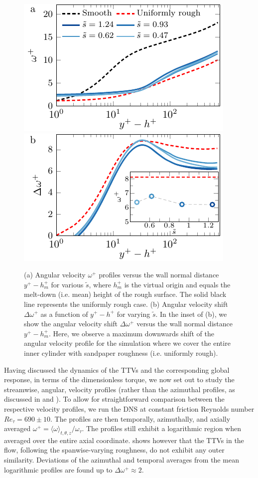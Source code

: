 \begin{figure}
\centering
  \includegraphics[width=0.49\linewidth]{fig9a_omegaplus.pdf}
  \includegraphics[width=0.49\linewidth]{fig9b_d0.pdf}
\caption{
(a) Angular velocity $\omega^+$ profiles versus the wall normal distance $y^+-h_m^+$ for various $\tilde{s}$, where $h_m^+$ is the virtual origin and equals the melt-down (i.e. mean) height of the rough surface. The solid black line represents the uniformly rough case. (b) Angular velocity shift $\Delta \omega^+$ as a function of $y^+-h^+$ for varying $\tilde s$. In the inset of (b), we show the angular velocity shift $\Delta \omega^+$ versus the wall normal distance $y^+-h_m^+$. Here, we observe a maximum downwards shift of the angular velocity profile for the simulation where we cover the entire inner cylinder with sandpaper roughness (i.e. uniformly rough). }
\label{fig:o_do}
\end{figure}

Having discussed the dynamics of the TTVs and the corresponding global response, in terms of the dimensionless torque, we now set out to study the streamwise, angular, velocity profiles (rather than the azimuthal profiles, as discussed in \cite{Grossmann2014} and \cite{Berghout2018}). To allow for straightforward comparison between the respective velocity profiles, we run the DNS at constant friction Reynolds number $Re_\tau = 690 \pm 10$. The profiles are then temporally, azimuthally, and axially averaged $\omega^+ = \langle \omega \rangle_{t,\theta,z}/\omega_\tau$. The profiles still exhibit a logarithmic region when averaged over the entire axial coordinate.  shows however that the TTVs in the flow, following the spanwise-varying roughness, do not exhibit any outer similarity. Deviations of the azimuthal and temporal averages from the mean logarithmic profiles are found up to $\Delta \omega^+ \approx 2$. 


